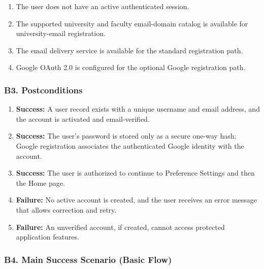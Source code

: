 \documentclass[12pt]{article}
\begin{document}
\begin{enumerate}
\item The user does not have an active authenticated session.
\item The supported university and faculty email-domain catalog is available for university-email registration.
\item The email delivery service is available for the standard registration path.
\item Google OAuth 2.0 is configured for the optional Google registration path.
\end{enumerate}
\par\medskip

\hypertarget{sec:b3-postconditions}{}
\subsubsection*{B3. Postconditions}
\par\medskip

\begin{enumerate}
\item \textbf{Success:} A user record exists with a unique username and email address, and the account is activated and email-verified.
\item \textbf{Success:} The user's password is stored only as a secure one-way hash; Google registration associates the authenticated Google identity with the account.
\item \textbf{Success:} The user is authorized to continue to Preference Settings and then the Home page.
\item \textbf{Failure:} No active account is created, and the user receives an error message that allows correction and retry.
\item \textbf{Failure:} An unverified account, if created, cannot access protected application features.
\end{enumerate}
\par\medskip

\hypertarget{sec:b4-main-success-scenario-basic-flow}{}
\subsubsection*{B4. Main Success Scenario (Basic Flow)}
\par\medskip
\end{document}

